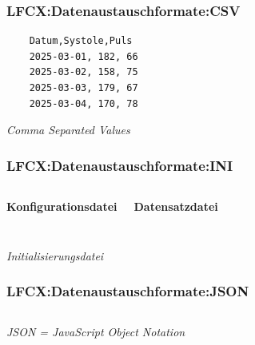 \begin{frame}[fragile] 
  \frametitle{LFCX:Datenaustauschformate:CSV}


  \begin{center}
  \begin{minipage}{0.5\textwidth}
  \begin{verbatim}
    Datum,Systole,Puls
    2025-03-01, 182, 66
    2025-03-02, 158, 75
    2025-03-03, 179, 67
    2025-03-04, 170, 78
  \end{verbatim}
  \end{minipage}
  \end{center}
  \vspace{0.6cm}
  \begin{flushright}
    \begin{tiny}
      \textrm{\textit{Comma Separated Values}}
    \end{tiny}
  \end{flushright}
\end{frame}

\begin{frame}[fragile]   
  \frametitle{LFCX:Datenaustauschformate:INI}
  \begin{columns}[t]
    \begin{center}
    \begin{minipage}{0.6\textwidth}
      \textbf{Konfigurationsdatei}
      \inputminted[fontsize=\small,linenos]{ini}{\snpLf/cx-dff-config.ini}   
    \end{minipage}
    \end{center}
    \begin{center}
    \begin{minipage}{0.5\textwidth}
      \textbf{Datensatzdatei}
      \inputminted[fontsize=\small,linenos]{ini}{\snpLf/cx-dff-measure.ini}   
    \end{minipage}
    \end{center}
  \end{columns}

  \vspace{0.6cm}
  \begin{flushright}
    \begin{tiny}
      \textrm{\textit{Initialisierungsdatei}}
    \end{tiny}
  \end{flushright}
\end{frame}

\begin{frame}[fragile]  
  \frametitle{LFCX:Datenaustauschformate:JSON}
  \begin{center}
  \begin{minipage}{0.4\textwidth}
    \inputminted[fontsize=\footnotesize,linenos]{json}{\snpLf/cx-dff-measure.json}   
  \end{minipage}
  \end{center}

  \begin{flushright}
    \begin{tiny}
      \textrm{\textit{JSON = JavaScript Object Notation}}
    \end{tiny}
  \end{flushright}
\end{frame}

